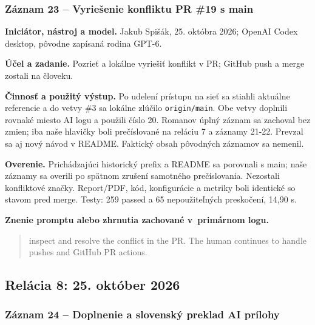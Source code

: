 \subsubsection*{Záznam 23 -- Vyriešenie konfliktu PR \#19 s main}


\par\noindent \textbf{Iniciátor, nástroj a model.} Jakub Spišák, 25. októbra 2026; OpenAI Codex desktop, pôvodne zapísaná rodina GPT-6.\par\smallskip
\par\noindent \textbf{Účel a zadanie.} Pozrieť a lokálne vyriešiť konflikt v PR; GitHub push a merge zostali na človeku.\par\smallskip
\par\noindent \textbf{Činnosť a použitý výstup.} Po udelení prístupu na sieť sa stiahli aktuálne referencie a do vetvy \#3 sa lokálne zlúčilo \texttt{origin/\allowbreak{}main}. Obe vetvy doplnili rovnaké miesto AI logu a použili číslo 20. Romanov úplný záznam sa zachoval bez zmien; iba naše hlavičky boli prečíslované na reláciu 7 a záznamy 21-22. Prevzal sa aj nový návod v README. Faktický obsah pôvodných záznamov sa nemenil.\par\smallskip
\par\noindent \textbf{Overenie.} Prichádzajúci historický prefix a README sa porovnali s main; naše záznamy sa overili po spätnom zrušení samotného prečíslovania. Nezostali konfliktové značky. Report/PDF, kód, konfigurácie a metriky boli identické so stavom pred merge. Testy: 259 passed a 65 nepoužiteľných preskočení, 14,90 s.\par\smallskip

\par\noindent\textbf{Znenie promptu alebo zhrnutia zachované v~primárnom logu.}

\begin{quote}\normalsize inspect and resolve the conflict in the PR. The human continues to handle pushes and GitHub PR actions.\end{quote}

\subsection*{Relácia 8: 25. október 2026}

\subsubsection*{Záznam 24 -- Doplnenie a slovenský preklad AI prílohy}


